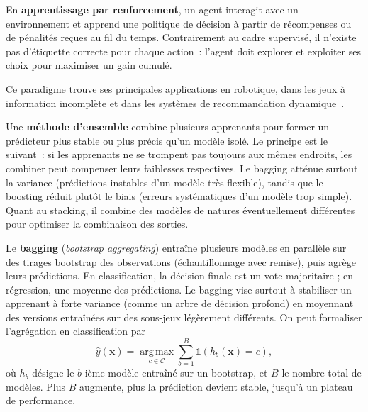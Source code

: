 \label{sec:ml-rl}

En \textbf{apprentissage par renforcement}, un agent interagit avec un environnement et apprend une politique de d\'ecision \`a partir de r\'ecompenses ou de p\'enalit\'es re\c{c}ues au fil du temps.
Contrairement au cadre supervis\'e, il n'existe pas d'\'etiquette correcte pour chaque action~: l'agent doit explorer et exploiter ses choix pour maximiser un gain cumul\'e.

Ce paradigme trouve ses principales applications en robotique, dans les jeux \`a information incompl\`ete et dans les syst\`emes de recommandation dynamique~\cite{sutton2018rl}.


\label{sec:ensemble}

Une \textbf{m\'ethode d'ensemble} combine plusieurs apprenants pour former un pr\'edicteur plus stable ou plus pr\'ecis qu'un mod\`ele isol\'e.
Le principe est le suivant~: si les apprenants ne se trompent pas toujours aux m\^emes endroits, les combiner peut compenser leurs faiblesses respectives.
Le bagging att\'enue surtout la variance (pr\'edictions instables d'un mod\`ele tr\`es flexible), tandis que le boosting r\'eduit plut\^ot le biais (erreurs syst\'ematiques d'un mod\`ele trop simple). Quant au stacking, il combine des mod\`eles de natures \'eventuellement diff\'erentes pour optimiser la combinaison des sorties.


\label{sec:bagging}

Le \textbf{bagging} (\emph{bootstrap aggregating}) entra\^ine plusieurs mod\`eles en parall\`ele sur des tirages bootstrap des observations (\'echantillonnage avec remise), puis agr\`ege leurs pr\'edictions.
En classification, la d\'ecision finale est un vote majoritaire ; en r\'egression, une moyenne des pr\'edictions.
Le bagging vise surtout \`a stabiliser un apprenant \`a forte variance (comme un arbre de d\'ecision profond) en moyennant des versions entra\^in\'ees sur des sous-jeux l\'eg\`erement diff\'erents.
On peut formaliser l'agr\'egation en classification par
\[
\hat{y}(\mathbf{x}) = \operatorname*{arg\,max}_{c \in \mathcal{C}} \sum_{b=1}^{B} \mathbb{1}\!\left(h_b(\mathbf{x}) = c\right),
\]
o\`u $h_b$ d\'esigne le $b$-i\`eme mod\`ele entra\^in\'e sur un bootstrap, et $B$ le nombre total de mod\`eles.
Plus $B$ augmente, plus la pr\'ediction devient stable, jusqu'\`a un plateau de performance.


